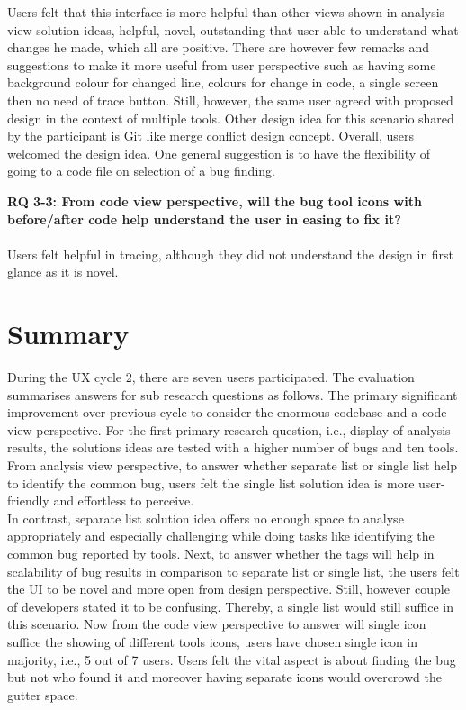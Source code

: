 Users felt that this interface is more helpful than other views shown in analysis view solution ideas, helpful, novel, outstanding that user able to understand what changes he made, which all are positive. There are however few remarks and suggestions to make it more useful from user perspective such as having some background colour for changed line, colours for change in code, a single screen then no need of trace button. Still, however, the same user agreed with proposed design in the context of multiple tools. Other design idea for this scenario shared by the participant is Git like merge conflict design concept. Overall, users welcomed the design idea. One general suggestion is to have the flexibility of going to a code file on selection of a bug finding. \\


\begin{myboxi}{{\textbf{RQ 3-3: From code view perspective, will the bug tool icons with before/after code help understand the user in easing to fix it?}}}
\\ \\ Users felt helpful in tracing, although they did not understand the design in first glance as it is novel.
\end{myboxi}


\section{Summary}

During the UX cycle 2, there are seven users participated. The evaluation summarises answers for sub research questions as follows. The primary significant improvement over previous cycle to consider the enormous codebase and a code view perspective. For the first primary research question, i.e., display of analysis results, the solutions ideas are tested with a higher number of bugs and ten tools. From analysis view perspective, to answer whether separate list or single list help to identify the common bug, users felt the single list solution idea is more user-friendly and effortless to perceive. \\

In contrast, separate list solution idea offers no enough space to analyse appropriately and especially challenging while doing tasks like identifying the common bug reported by tools. Next, to answer whether the tags will help in scalability of bug results in comparison to separate list or single list, the users felt the UI to be novel and more open from design perspective. Still, however couple of developers stated it to be confusing. Thereby, a single list would still suffice in this scenario. Now from the code view perspective to answer will single icon suffice the showing of different tools icons, users have chosen single icon in majority, i.e., 5 out of 7 users. Users felt the vital aspect is about finding the bug but not who found it and moreover having separate icons would overcrowd the gutter space. \\

